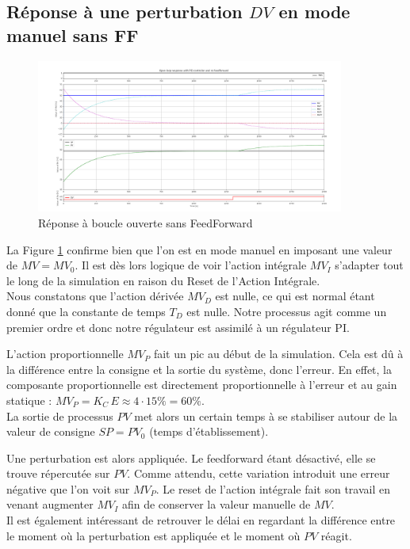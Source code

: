 \subsection{Réponse à une perturbation \texorpdfstring{$DV$}{DV} en mode manuel sans FF}
\begin{figure}[H]
    \centering
    \includegraphics[width=0.9\textwidth]{../Plots/Simulation_scenario_2.png}
    \caption{Réponse à boucle ouverte sans FeedForward}
    \label{fig:Simulation_OLP_no_FF}
\end{figure}
La Figure \ref{fig:Simulation_OLP_no_FF} confirme bien que l'on est en mode manuel en imposant une valeur de $MV = MV_0$.
Il est dès lors logique de voir l'action intégrale $MV_I$ s'adapter tout le long de la simulation en raison du Reset de l'Action Intégrale.\\
Nous constatons que l'action dérivée $MV_D$ est nulle, ce qui est normal étant donné que la constante de temps $T_D$ est nulle. Notre processus agit comme un premier ordre et donc notre régulateur est assimilé à un régulateur PI.

L'action proportionnelle $MV_P$ fait un pic au début de la simulation. Cela est dû à la différence entre la consigne et la sortie du système, donc l'erreur.
En effet, la composante proportionnelle est directement proportionnelle à l'erreur et au gain statique : $MV_P = K_C \, E \approx 4 \cdot 15\% = 60\%$.\\
La sortie de processus $PV$ met alors un certain temps à se stabiliser autour de la valeur de consigne $SP = PV_0$ (temps d'établissement).

Une perturbation est alors appliquée. Le feedforward étant désactivé, elle se trouve répercutée sur $PV$.
Comme attendu, cette variation introduit une erreur négative que l'on voit sur $MV_P$. Le reset de l'action intégrale fait son travail en venant augmenter $MV_I$ afin de conserver la valeur manuelle de $MV$.\\
Il est également intéressant de retrouver le délai en regardant la différence entre le moment où la perturbation est appliquée et le moment où $PV$ réagit.

